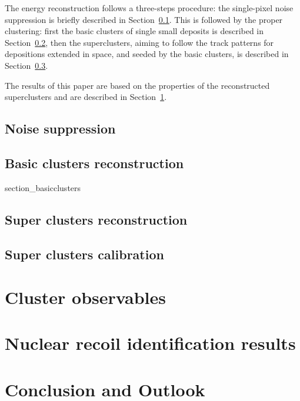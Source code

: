 \documentclass[12pt]{iopart}
\begin{document}
The energy reconstruction follows a three-steps procedure: the
single-pixel noise suppression is briefly described in
Section~\ref{sec:zerosuppression}. This is followed by the proper  clustering: first the basic clusters of single small deposits is
described in Section~\ref{sec:basiccl}, then the superclusters, aiming
to follow the track patterns for depositions extended in space, and
seeded by the basic clusters, is described in
Section~\ref{sec:supercl}.

The results of this paper are based on the properties of the
reconstructed superclusters and are described in
Section~\ref{sec:clustershapes}.


\subsection{Noise suppression}
\label{sec:zerosuppression}



\subsection{Basic clusters reconstruction}
\label{sec:basiccl}
 {section_basicclusters}


\subsection{Super clusters reconstruction}
\label{sec:supercl}


\subsection{Super clusters calibration}
\label{sec:calibration}



\section{Cluster observables}
\label{sec:clustershapes}


 
\section{Nuclear recoil identification results}
\label{sec:results}

 
\clearpage

\section{Conclusion and Outlook}
 
\end{document}
